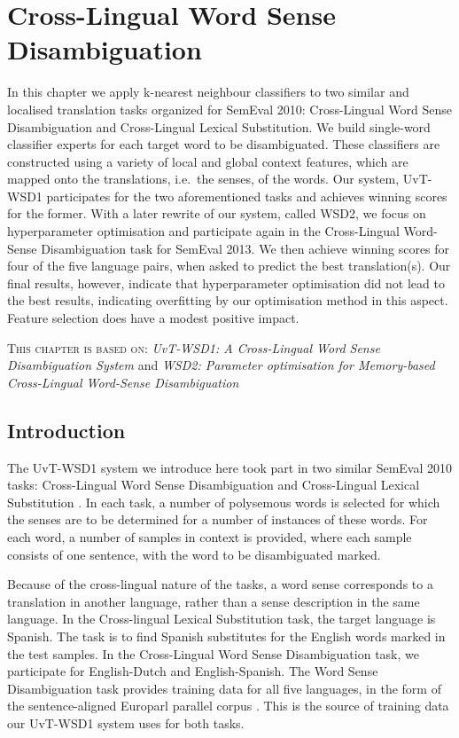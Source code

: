 \chapter{Cross-Lingual Word Sense Disambiguation}
\label{chap:clwsd}



In this chapter we apply k-nearest neighbour classifiers to two similar and
localised translation tasks organized for SemEval 2010: Cross-Lingual Word
Sense Disambiguation and Cross-Lingual Lexical Substitution. We build
single-word classifier experts for each target word to be disambiguated. These
classifiers are constructed using a variety of local and global context
features, which are mapped onto the translations, i.e.\ the senses, of the
words. Our system, UvT-WSD1 participates for the two aforementioned tasks and
achieves winning scores for the former. With a later rewrite of our system,
called WSD2, we focus on hyperparameter optimisation and participate again in
the Cross-Lingual Word-Sense Disambiguation task for SemEval 2013. We then
achieve winning scores for four of the five language pairs, when asked to
predict the best translation(s). Our final results, however, indicate that
hyperparameter optimisation did not lead to the best results, indicating
overfitting by our optimisation method in this aspect. Feature selection does
have a modest positive impact.


\textsc{This chapter is based on: } \emph{UvT-WSD1: A Cross-Lingual Word Sense
Disambiguation System} and \emph{WSD2: Parameter optimisation for Memory-based Cross-Lingual Word-Sense Disambiguation}


\section{Introduction}

The UvT-WSD1 system we introduce here took part in two similar SemEval 2010
tasks: Cross-Lingual Word Sense Disambiguation \citep{WSD} and Cross-Lingual
Lexical Substitution \citep{CLLS}. In each task, a number of polysemous words is
selected for which the senses are to be determined for a number of instances of
these words. For each word, a number of samples in context is provided, where
each sample consists of one sentence, with the word to be disambiguated marked. 

Because of the cross-lingual nature of the tasks, a word sense corresponds to a
translation in another language, rather than a sense description in the same
language. In the Cross-lingual Lexical Substitution task, the target language
is Spanish. The task is to find Spanish substitutes for the English words
marked in the test samples. In the Cross-Lingual Word Sense Disambiguation
task, we participate for English-Dutch and English-Spanish. The Word Sense
Disambiguation task provides training data for all five languages, in the form
of the sentence-aligned Europarl parallel corpus \citep{EUROPARL}. This is the
source of training data our UvT-WSD1 system uses for both tasks.

